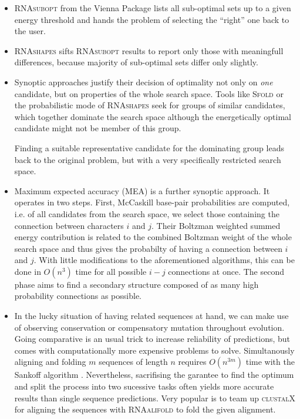 \documentclass[paper=a4,fontsize=12pt]{scrartcl}
\newcommand{\progname}[1]{\mbox{\textsc{#1}}\xspace}
\def\rnasubopt{\progname{RNAsubopt}}
\def\rnashapes{\progname{RNAshapes}}
\def\sfold{\progname{Sfold}}
\def\clustalx{\progname{clustalX}}
\def\rnaalifold{\progname{RNAalifold}}
\begin{document}
\begin{itemize}
	\item{\rnasubopt from the Vienna Package \cite{LOR:BER:HOE:TAF:FLA:STA:HOF:2011} lists all sub-optimal sets up to a given energy threshold and hands the problem of selecting the ``right'' one back to the user.}
	\item{\rnashapes \cite{GIE:VOSS:REH:2004} sifts \rnasubopt results to report only those with meaningfull differences, because majority of sub-optimal sets differ only slightly.}
	\item{Synoptic approaches justify their decision of optimality not only on \emph{one} candidate, but on properties of the whole search space. Tools like \sfold \cite{CHA:LAW:DIN:2005} or the probabilistic mode of \rnashapes \cite{JAN:GIE:2010} seek for groups of similar candidates, which together dominate the search space although the energetically optimal candidate might not be member of this group.
	
	Finding a suitable representative candidate for the dominating group leads back to the original problem, but with a very specifically restricted search space.}
	\item{Maximum expected accuracy (MEA) is a further synoptic approach. It operates in two steps. First, McCaskill base-pair probabilities are computed, i.e. of all candidates from the search space, we select those containing the connection between characters $i$ and $j$. Their Boltzman weighted summed energy contribution is related to the combined Boltzman weight of the whole search space and thus gives the probabilty of having a connection between $i$ and $j$. With little modifications to the aforementioned algorithms, this can be done in $O(n^3)$ time for all possible $i-j$ connections at once. The second phase aims to find a secondary structure composed of as many high probability connections as possible.}
	\item{In the lucky situation of having related sequences at hand, we can make use of observing conservation or compensatory mutation throughout evolution. Going comparative is an usual trick to increase reliability of predictions, but comes with computationally more expensive problems to solve. Simultanously aligning and folding $m$ sequences of length $n$ requires $O(n^{3m})$ time with the Sankoff algorithm \cite{SAN:1985}. Nevertheless, sacrifising the garantee to find the optimum and split the process into two sucessive tasks often yields more accurate results than single sequence predictions. Very popular is to team up \clustalx for aligning the sequences with \rnaalifold to fold the given alignment.}
\end{itemize}





\end{document}
